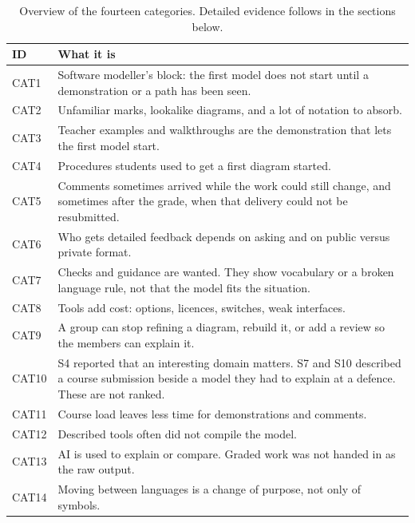 \begin{table}[ht]
\centering
\small
\caption{Overview of the fourteen categories. Detailed evidence follows in the sections below.}
\label{tab:cat_roster}
\begin{tabularx}{\textwidth}{l >{\raggedright\arraybackslash}X}
\toprule
\textbf{ID} & \textbf{What it is} \\
\midrule
CAT1 & Software modeller's block: the first model does not start until a demonstration or a path has been seen. \\
CAT2 & Unfamiliar marks, lookalike diagrams, and a lot of notation to absorb. \\
CAT3 & Teacher examples and walkthroughs are the demonstration that lets the first model start. \\
CAT4 & Procedures students used to get a first diagram started. \\
CAT5 & Comments sometimes arrived while the work could still change, and sometimes after the grade, when that delivery could not be resubmitted. \\
CAT6 & Who gets detailed feedback depends on asking and on public versus private format. \\
CAT7 & Checks and guidance are wanted. They show vocabulary or a broken language rule, not that the model fits the situation. \\
CAT8 & Tools add cost: options, licences, switches, weak interfaces. \\
CAT9 & A group can stop refining a diagram, rebuild it, or add a review so the members can explain it. \\
CAT10 & S4 reported that an interesting domain matters. S7 and S10 described a course submission beside a model they had to explain at a defence. These are not ranked. \\
CAT11 & Course load leaves less time for demonstrations and comments. \\
CAT12 & Described tools often did not compile the model. \\
CAT13 & AI is used to explain or compare. Graded work was not handed in as the raw output. \\
CAT14 & Moving between languages is a change of purpose, not only of symbols. \\
\bottomrule
\end{tabularx}
\end{table}

